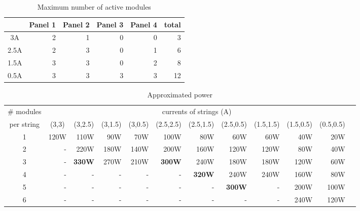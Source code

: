 \documentclass[conference]{IEEEtran}
\begin{document}
\begin{table}[t]
\caption{Maximum number of active modules}
\label{tab:modules}
\centering
\begin{tabular}{|c|r|r|r|r|r|}	
\hline									
	&	\multicolumn{1}{|c|}{Panel 1}	&	\multicolumn{1}{|c|}{Panel 2}	&	\multicolumn{1}{|c|}{Panel 3}	&	\multicolumn{1}{|c|}{Panel 4} &	\multicolumn{1}{|c|}{total}	\\ \hline
3A	&	2	&	1	&	0	&	0 & 3	\\ \hline
2.5A	&	2	&	3	&	0	&	1 & 6	\\ \hline
1.5A	&	3	&	3	&	0	&	2 & 8	\\ \hline
0.5A	&	3	&	3	&	3	&	3 & 12	\\ \hline
\end{tabular}
\end{table}

\begin{table}[t]
\caption{Approximated power}
\label{tab:powers}
\centering
\begin{tabular}{|c|r|r|r|r|r|r|r|r|r|r|r|}
\hline	
\# modules & 	\multicolumn{10}{|c|}{currents of strings (A)} \\ \cline{2-11}																		
per string		&	\multicolumn{1}{|c|}{(3,3)}	&	\multicolumn{1}{|c|}{(3,2.5)}	&	\multicolumn{1}{|c|}{(3,1.5)}	&	\multicolumn{1}{|c|}{(3,0.5)}	&	\multicolumn{1}{|c|}{(2.5,2.5)}	&	\multicolumn{1}{|c|}{(2.5,1.5)}	&	\multicolumn{1}{|c|}{(2.5,0.5)}	&	\multicolumn{1}{|c|}{(1.5,1.5)}	&	\multicolumn{1}{|c|}{(1.5,0.5)}	&	\multicolumn{1}{|c|}{(0.5,0.5)}	\\ \hline
	1	&	120W	&	110W	&	90W	&	70W	&	100W	&	80W	&	60W	&	60W	&	40W	&	20W	\\ \hline
	2	&	-	&	220W	&	180W	&	140W	&	200W	&	160W	&	120W	&	120W	&	80W	&	40W	\\ \hline	3	&	-	&\textbf{330W}&	270W	&	210W	&	\textbf{300W}	&	240W	&	180W	&	180W	&	120W	&	60W	\\ \hline
4	&	-	&	-	&	-	&	-	&	-	&	\textbf{320W}	&	240W	&	240W	&	160W	&	80W	\\ \hline
	 5	&	-	&	-	&	-	&	-	&	-	&	-	&	\textbf{300W}	&	-	&	200W	&	100W	\\ \hline
	6	&	-	&	-	&	-	&	-	&	-	&	-	&	-	&	-	&	240W	&	120W	\\ \hline
\end{tabular}
\end{table}

\end{document}
